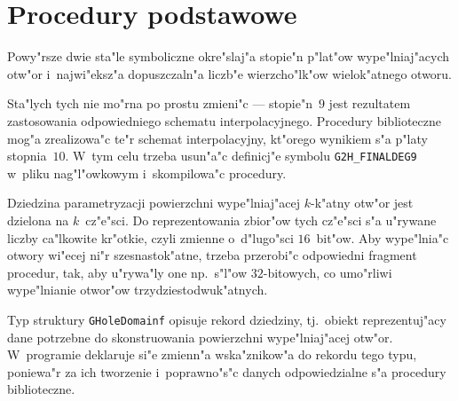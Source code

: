 \section{Procedury podstawowe}

\begin{sloppypar}
\hspace*{\parindent}
Powy"rsze dwie sta"le symboliczne okre"slaj"a stopie"n p"lat"ow wype"lniaj"acych
otw"or i~najwi"eksz"a dopuszczaln"a liczb"e wierzcho"lk"ow wielok"atnego otworu.%
\end{sloppypar}

Sta"lych tych nie mo"rna po prostu zmieni"c --- stopie"n~$9$ jest rezultatem
zastosowania odpowiedniego schematu interpolacyjnego. Procedury biblioteczne
mog"a zrealizowa"c te"r schemat interpolacyjny, kt"orego wynikiem s"a p"laty
stopnia~$10$. W~tym celu trzeba usun"a"c definicj"e symbolu
\texttt{G2H\_FINALDEG9} w~pliku nag"l"owkowym i~skompilowa"c procedury.

Dziedzina parametryzacji powierzchni wype"lniaj"acej $k$-k"atny otw"or jest
dzielona na $k$~cz"e"sci. Do reprezentowania zbior"ow tych cz"e"sci s"a
u"rywane liczby ca"lkowite kr"otkie, czyli zmienne o~d"lugo"sci $16$~bit"ow.
Aby wype"lnia"c
otwory wi"ecej ni"r szesnastok"atne, trzeba przerobi"c odpowiedni fragment
procedur, tak, aby u"rywa"ly one np.\ s"l"ow $32$-bitowych, co umo"rliwi
wype"lnianie otwor"ow trzydziestodwuk"atnych.

\vspace{\bigskipamount}
Typ struktury \texttt{GHoleDomainf} opisuje rekord dziedziny, tj.\ obiekt
reprezentuj"acy dane potrzebne do skonstruowania powierzchni
wype"lniaj"acej otw"or. W~programie deklaruje si"e zmienn"a wska"znikow"a
do rekordu tego typu, poniewa"r za ich tworzenie i~poprawno"s"c danych
odpowiedzialne s"a procedury biblioteczne.

